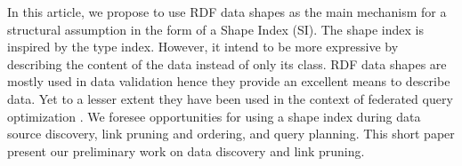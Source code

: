 In this article, we propose to use RDF data shapes as the main mechanism for a structural assumption in the form of a Shape Index (SI).
The shape index is inspired by the type index.
However, it intend to be more expressive by describing the content of the data instead of only its class.
RDF data shapes are mostly used in data validation \cite{Gayo2018a} hence they provide an excellent means to describe data.
Yet to a lesser extent they have been used in the context of federated query optimization \cite{kashif2021}.
We foresee opportunities for using a shape index during data source discovery, link pruning and ordering, and query planning.
This short paper present our preliminary work on data discovery and link pruning.